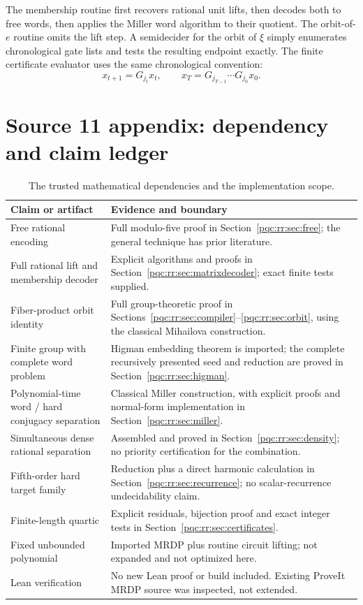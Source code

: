 \documentclass[11pt,letterpaper]{article}
\numberwithin{equation}{section}
\theoremstyle{definition}
\theoremstyle{remark}
\begin{document}
The membership routine first recovers rational unit lifts, then decodes
both to free words, then applies the Miller word algorithm to their
quotient. The orbit-of-$e$ routine omits the lift step. A semidecider for
the orbit of $\xi$ simply enumerates chronological gate lists and tests
the resulting endpoint exactly. The finite certificate evaluator uses
the same chronological convention:
\[
 x_{t+1}=G_{j_t}x_t,
 \qquad x_T=G_{j_{T-1}}\cdots G_{j_0}x_0.
\]

\section{Source 11 appendix: dependency and claim ledger}
\label{pqc:rr:app:ledger}

\begin{table}[htbp]
\centering\small
\begin{tabularx}{\textwidth}{@{}p{}X@{}}
\toprule
Claim or artifact & Evidence and boundary\\
\midrule
Free rational encoding & Full modulo-five proof in
Section~\ref{pqc:rr:sec:free}; the general technique has prior literature.\\
Full rational lift and membership decoder & Explicit algorithms and proofs
in Section~\ref{pqc:rr:sec:matrixdecoder}; exact finite tests supplied.\\
Fiber-product orbit identity & Full group-theoretic proof in
Sections~\ref{pqc:rr:sec:compiler}--\ref{pqc:rr:sec:orbit}, using the classical
Mihailova construction.\\
Finite group with complete word problem & Higman embedding theorem is
imported; the complete recursively presented seed and reduction are
proved in Section~\ref{pqc:rr:sec:higman}.\\
Polynomial-time word / hard conjugacy separation & Classical Miller
construction, with explicit proofs and normal-form implementation in
Section~\ref{pqc:rr:sec:miller}.\\
Simultaneous dense rational separation & Assembled and proved in
Section~\ref{pqc:rr:sec:density}; no priority certification for the combination.\\
Fifth-order hard target family & Reduction plus a direct harmonic
calculation in Section~\ref{pqc:rr:sec:recurrence}; no scalar-recurrence
undecidability claim.\\
Finite-length quartic & Explicit residuals, bijection proof and exact
integer tests in Section~\ref{pqc:rr:sec:certificates}.\\
Fixed unbounded polynomial & Imported MRDP plus routine circuit lifting;
not expanded and not optimized here.\\
Lean verification & No new Lean proof or build included. Existing ProveIt
MRDP source was inspected, not extended.\\
\bottomrule
\end{tabularx}
\caption{The trusted mathematical dependencies and the implementation scope.}
\end{table}
\end{document}
